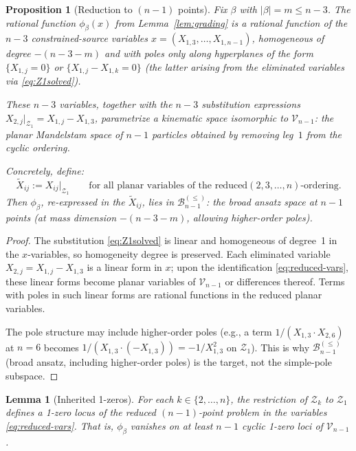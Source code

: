\documentclass[11pt]{article}
\theoremstyle{plain}
\newtheorem{proposition}[theorem]{Proposition}
\newtheorem{lemma}[theorem]{Lemma}
\theoremstyle{definition}
\newcommand{\cB}{\mathcal{B}}
\newcommand{\cV}{\mathcal{V}}
\newcommand{\cZ}{\mathcal{Z}}
\begin{document}
\begin{proposition}[Reduction to $(n{-}1)$ points]\label{prop:reduce}
Fix $\beta$ with $|\beta| = m \leq n{-}3$. The rational function
$\phi_\beta(x)$ from Lemma~\ref{lem:grading} is a rational function
of the $n{-}3$ constrained-source variables $x = (X_{1,3},\ldots,X_{1,n-1})$,
homogeneous of degree $-(n{-}3{-}m)$ and with poles only along
hyperplanes of the form $\{X_{1,j}=0\}$ or $\{X_{1,j}-X_{1,k}=0\}$
(the latter arising from the eliminated variables via
\eqref{eq:Z1solved}).

These $n{-}3$ variables, together with the
$n{-}3$ substitution expressions $X_{2,j}|_{\cZ_1} = X_{1,j}-X_{1,3}$,
parametrize a kinematic space isomorphic to $\cV_{n-1}$: the
planar Mandelstam space of $n{-}1$ particles obtained by removing
leg~$1$ from the cyclic ordering.

Concretely, define:
\begin{equation}
\widetilde{X}_{ij} := X_{ij}\big|_{\cZ_1}
\qquad\text{for all planar variables of the reduced
$(2,3,\ldots,n)$-ordering.}
\label{eq:reduced-vars}
\end{equation}
Then $\phi_\beta$, re-expressed in the $\widetilde{X}_{ij}$, lies in
$\cB_{n-1}^{(\leq)}$: the broad ansatz space at $n{-}1$ points
(at mass dimension $-(n{-}3{-}m)$, allowing higher-order poles).
\end{proposition}

\begin{proof}
The substitution \eqref{eq:Z1solved} is linear and homogeneous of
degree~1 in the $x$-variables, so homogeneity degree is preserved.
Each eliminated variable $X_{2,j} = X_{1,j} - X_{1,3}$ is a linear
form in $x$; upon the identification \eqref{eq:reduced-vars}, these
linear forms become planar variables of $\cV_{n-1}$ or differences
thereof. Terms with poles in such linear forms are rational
functions in the reduced planar variables.

The pole structure may include higher-order poles (e.g., a term
$1/(X_{1,3}\cdot X_{2,6})$ at $n=6$ becomes $1/(X_{1,3}\cdot(-X_{1,3}))
= -1/X_{1,3}^2$ on $\cZ_1$). This is why $\cB_{n-1}^{(\leq)}$
(broad ansatz, including higher-order poles) is the target, not
the simple-pole subspace.
\end{proof}

\begin{lemma}[Inherited 1-zeros]\label{lem:inherited}
For each $k\in\{2,\ldots,n\}$, the restriction of $\cZ_k$ to $\cZ_1$
defines a 1-zero locus of the reduced $(n{-}1)$-point problem in
the variables \eqref{eq:reduced-vars}. That is, $\phi_\beta$
vanishes on at least $n{-}1$ cyclic 1-zero loci of $\cV_{n-1}$.
\end{lemma}
\end{document}
